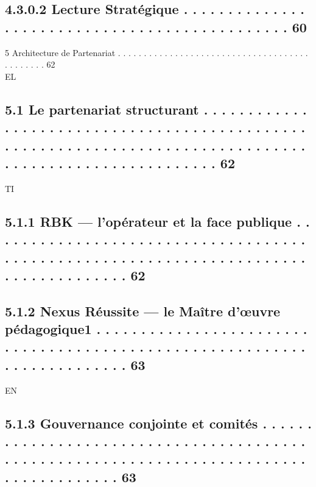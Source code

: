 \subsection{4.3.0.2           Lecture Stratégique . . . . . . . . . . . . . . . . . . . . . . . . . . . . . . . . . . . . . . . . . . . . . .                                                                                                        60}
5       Architecture de Partenariat . . . . . . . . . . . . . . . . . . . . . . . . . . . . . . . . . . . . . . . . . . . . . 62\\
\vspace{0.5em}
\vspace{0.5em}
\vspace{0.5em}
\vspace{0.5em}
EL\\
\subsection{5.1     Le partenariat structurant . . . . . . . . . . . . . . . . . . . . . . . . . . . . . . . . . . . . . . . . . . . . . . . . . . . . . . . . . . . . . . . . . . . . . . . . . . . . . . . . . . . . . . . . . . . . . . . . . . . . . . . . 62}
\vspace{0.5em}
\vspace{0.5em}
\vspace{0.5em}
\vspace{0.5em}
TI\\
\subsection{5.1.1              RBK — l’opérateur et la face publique . . . . . . . . . . . . . . . . . . . . . . . . . . . . . . . . . . . . . . . . . . . . . . . . . . . . . . . . . . . . . . . . . . . . . . . . . . . . . . . . . . . . 62}
\subsection{5.1.2              Nexus Réussite — le Maître d’œuvre pédagogique1 . . . . . . . . . . . . . . . . . . . . . . . . . . . . . . . . . . . . . . . . . . . . . . . . . . . . . . . . . . . . . . . . . . . . . . . . 63}
\vspace{0.5em}
\vspace{0.5em}
\vspace{0.5em}
\vspace{0.5em}
EN\\
\subsection{5.1.3              Gouvernance conjointe et comités . . . . . . . . . . . . . . . . . . . . . . . . . . . . . . . . . . . . . . . . . . . . . . . . . . . . . . . . . . . . . . . . . . . . . . . . . . . . . . . . . . . . . . . 63}
